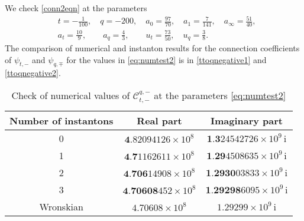 \documentclass[11pt]{article}
\numberwithin{equation}{section}
\begin{document}
We check \eqref{conn2eqn} at the parameters
\begin{equation}\label{eq:numtest2}
\begin{aligned}
&t=-\frac{1}{100},\quad
q=-200,\quad
a_0=\frac{97}{70},\quad
a_1=\frac{7}{141},\quad
a_{\infty}=\frac{51}{40},\\
&a_t=\frac{10}{9},\quad\quad
a_{q}=\frac{4}{3},\quad\quad
u_t=\frac{73}{50},\quad
u_{q}=\frac{3}{8}.
\end{aligned}
\end{equation}
The comparison of numerical and instanton results for the connection coefficients of $\psi_{t,-}$ and $\psi_{q,\mp}$ for the values in \eqref{eq:numtest2} is in \autoref{ttoqnegative1} and \autoref{ttoqnegative2}.
\begin{table}[h]
\centering
 \begin{tabular}{| c | c  c| }
    \hline
     Number of instantons & Real part  & Imaginary part  \\

    \hline   

    0  & $\textbf{4}.82094126\times 10^8$  & $\textbf{1.3}24542726\times 10^9$\,i  \\
        
    1  & $\textbf{4.7}1162611\times 10^8$  & $\textbf{1.29}4508635\times 10^9$\,i  \\

    2  & $\textbf{4.706}14908\times 10^8$  & $\textbf{1.2930}03833\times 10^9$\,i \\

    3  & $\textbf{4.70608}452\times 10^8$  & $\textbf{1.29298}6095\times 10^9$\,i \\
         \hline

    Wronskian & $4.70608\times 10^8$  &  $1.29299\times 10^9$\,i \\
         \hline
    \end{tabular}
    \caption{Check of numerical values of $\mathcal{C}_{t,-}^{q,-}$ at the parameters \eqref{eq:numtest2}}
    \label{ttoqnegative1}
\end{table}
\end{document}
